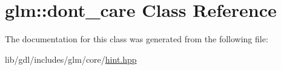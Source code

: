 \hypertarget{classglm_1_1dont__care}{}\section{glm\+:\+:dont\+\_\+care Class Reference}
\label{classglm_1_1dont__care}


The documentation for this class was generated from the following file\+:\begin{DoxyCompactItemize}
\item 
lib/gdl/includes/glm/core/\hyperlink{hint_8hpp}{hint.\+hpp}\end{DoxyCompactItemize}
